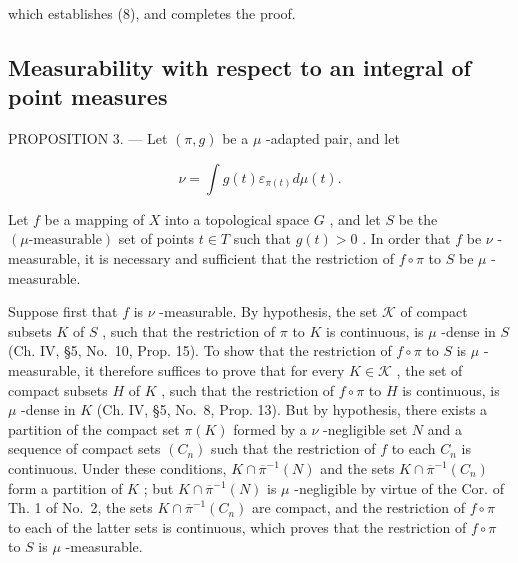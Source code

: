 which establishes (8), and completes the proof.

\subsection{Measurability with respect to an integral of point measures}

PROPOSITION 3. --- Let \((\pi, g)\) be a \(\mu\) -adapted pair, and let

\[
\nu = \int g (t) \varepsilon_ {\pi (t)} d \mu (t).
\]

Let \(f\) be a mapping of \(X\) into a topological space \(G\) , and let \(S\) be the \((\mu\text{-measurable})\) set of points \(t \in T\) such that \(g(t) > 0\) . In order that \(f\) be \(\nu\) -measurable, it is necessary and sufficient that the restriction of \(f \circ \pi\) to \(S\) be \(\mu\) -measurable.

Suppose first that \(f\) is \(\nu\) -measurable. By hypothesis, the set \(\mathcal{K}\) of compact subsets \(K\) of \(S\) , such that the restriction of \(\pi\) to \(K\) is continuous, is \(\mu\) -dense in \(S\) (Ch. IV, §5, No.~10, Prop. 15). To show that the restriction of \(f \circ \pi\) to \(S\) is \(\mu\) -measurable, it therefore suffices to prove that for every \(K \in \mathcal{K}\) , the set of compact subsets \(H\) of \(K\) , such that the restriction of \(f \circ \pi\) to \(H\) is continuous, is \(\mu\) -dense in \(K\) (Ch. IV, §5, No.~8, Prop. 13). But by hypothesis, there exists a partition of the compact set \(\pi(K)\) formed by a \(\nu\) -negligible set \(N\) and a sequence of compact sets \((C_n)\) such that the restriction of \(f\) to each \(C_n\) is continuous. Under these conditions, \(K \cap \overline{\pi}^{-1}(N)\) and the sets \(K \cap \overline{\pi}^{-1}(C_n)\) form a partition of \(K\) ; but \(K \cap \overline{\pi}^{-1}(N)\) is \(\mu\) -negligible by virtue of the Cor. of Th. 1 of No.~2, the sets \(K \cap \overline{\pi}^{-1}(C_n)\) are compact, and the restriction of \(f \circ \pi\) to each of the latter sets is continuous, which proves that the restriction of \(f \circ \pi\) to \(S\) is \(\mu\) -measurable.

